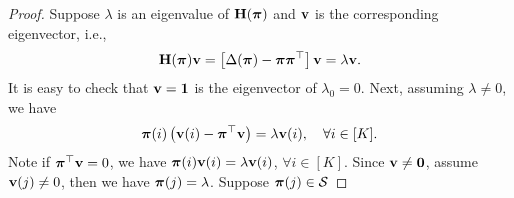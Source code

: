 \begin{proof}
Suppose $\lambda$ is an eigenvalue of ${\mathbf{H}}({\boldsymbol{\pi}})$ and ${\mathbf{v}}$ is the corresponding eigenvector, i.e.,
\begin{equation*}
    {\mathbf{H}}({\boldsymbol{\pi}}) {\mathbf{v}} = \left[ \Delta({\boldsymbol{\pi}}) - {\boldsymbol{\pi}}{\boldsymbol{\pi}}^\top \right] {\mathbf{v}} = \lambda {\mathbf{v}}.
\end{equation*}
It is easy to check that ${\mathbf{v}} = {\mathbf{1}}$ is the eigenvector of $\lambda_0 = 0$. Next, assuming $\lambda \not= 0$, we have
\begin{equation*}
    {\boldsymbol{\pi}}(i) \left( {\mathbf{v}}(i) - {\boldsymbol{\pi}}^\top {\mathbf{v}} \right) = \lambda {\mathbf{v}}(i), \quad \forall i \in [K].
\end{equation*}
Note if ${\boldsymbol{\pi}}^\top {\mathbf{v}} = 0$, we have ${\boldsymbol{\pi}}(i) {\mathbf{v}}(i) = \lambda {\mathbf{v}}(i)$, $\forall i \in [K]$. Since ${\mathbf{v}} \not= {\mathbf{0}}$, assume ${\mathbf{v}}(j) \not= 0$, then we have ${\boldsymbol{\pi}}(j) = \lambda$. Suppose ${\boldsymbol{\pi}}(j) \in {\mathcal{S}}$
\end{proof}

